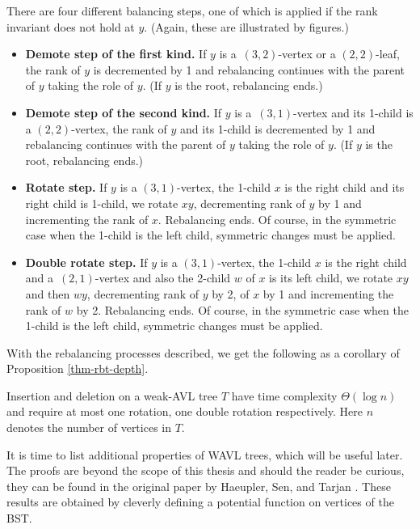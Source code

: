 There are four different balancing steps, one of which is applied if the rank invariant does not hold at $y$. (Again, these are illustrated by figures.)
\begin{itemize}
	\item \textbf{Demote step of the first kind.} If $y$ is a~$(3,2)$-vertex or a $(2,2)$-leaf, the rank of $y$ is decremented by 1 and rebalancing continues with the parent of $y$ taking the role of $y$. (If $y$ is the root, rebalancing ends.)
	\item \textbf{Demote step of the second kind.} If $y$ is a~$(3,1)$-vertex and its 1-child is a $(2,2)$-vertex, the rank of $y$ and its 1-child is decremented by 1 and rebalancing continues with the parent of $y$ taking the role of $y$. (If $y$ is the root, rebalancing ends.)
	\item \textbf{Rotate step.} If $y$ is a $(3,1)$-vertex, the 1-child $x$ is the right child and its right child is 1-child, we rotate $xy$, decrementing rank of $y$ by 1 and incrementing the rank of $x$. Rebalancing ends. Of course, in the symmetric case when the 1-child is the left child, symmetric changes must be applied.
	\item \textbf{Double rotate step.} If $y$ is a $(3,1)$-vertex, the 1-child $x$ is the right child and a~$(2,1)$-vertex and also the 2-child $w$ of $x$ is its left child, we rotate $xy$ and then $wy$, decrementing rank of $y$ by 2, of $x$ by 1 and incrementing the rank of $w$ by 2. Rebalancing ends. Of course, in the symmetric case when the 1-child is the left child, symmetric changes must be applied.
\end{itemize}









With the rebalancing processes described, we get the following as a corollary of Proposition \ref{thm-rbt-depth}.

\begin{prop}
Insertion and deletion on a weak-AVL tree $T$ have time complexity $\Theta(\log n)$ and require at most one rotation, one double rotation respectively. Here $n$ denotes the number of vertices in $T$.
\end{prop}

It is time to list additional properties of WAVL trees, which will be useful later. The proofs are beyond the scope of this thesis and should the reader be curious, they can be found in the original paper by Haeupler, Sen, and Tarjan \cite{rank-balanced-trees}. These results are obtained by cleverly defining a potential function on vertices of the BST.

